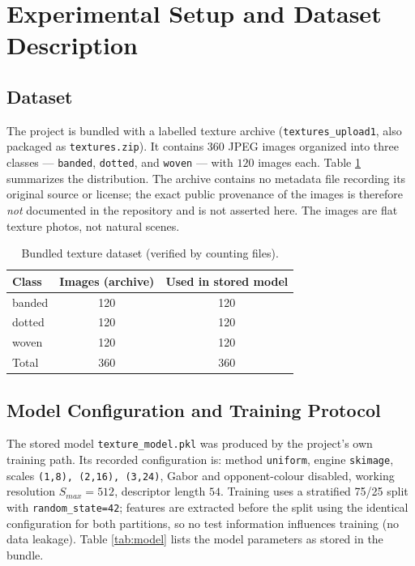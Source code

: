 \documentclass[conference]{IEEEtran}
\begin{document}
\section{Experimental Setup and Dataset Description}\label{sec:exp}
\subsection{Dataset}
The project is bundled with a labelled texture archive
(\texttt{textures\_upload1}, also packaged as \texttt{textures.zip}). It
contains $360$ JPEG images organized into three classes --- \texttt{banded},
\texttt{dotted}, and \texttt{woven} --- with $120$ images each. Table
\ref{tab:dataset} summarizes the distribution. The archive contains no
metadata file recording its original source or license; the exact public
provenance of the images is therefore \emph{not} documented in the
repository and is not asserted here. The images are flat texture photos,
not natural scenes.

\begin{table}[!t]
\renewcommand{\arraystretch}{1.15}
\caption{Bundled texture dataset (verified by counting files).}
\label{tab:dataset}
\centering
\begin{tabular}{@{}lcc@{}}
\hline
\bfseries Class & \bfseries Images (archive) & \bfseries Used in stored model\\
\hline
banded & 120 & 120\\
dotted & 120 & 120\\
woven  & 120 & 120\\
\hline
Total  & 360 & 360\\
\hline
\end{tabular}
\end{table}

\subsection{Model Configuration and Training Protocol}
The stored model \texttt{texture\_model.pkl} was produced by the project's
own training path. Its recorded configuration is: method
\texttt{uniform}, engine \texttt{skimage}, scales \texttt{(1,8), (2,16),
(3,24)}, Gabor and opponent-colour disabled, working resolution $S_{max}
=512$, descriptor length $54$. Training uses a stratified 75/25 split with
\texttt{random\_state=42}; features are extracted before the split using
the identical configuration for both partitions, so no test information
influences training (no data leakage). Table \ref{tab:model} lists the
model parameters as stored in the bundle.
\end{document}
